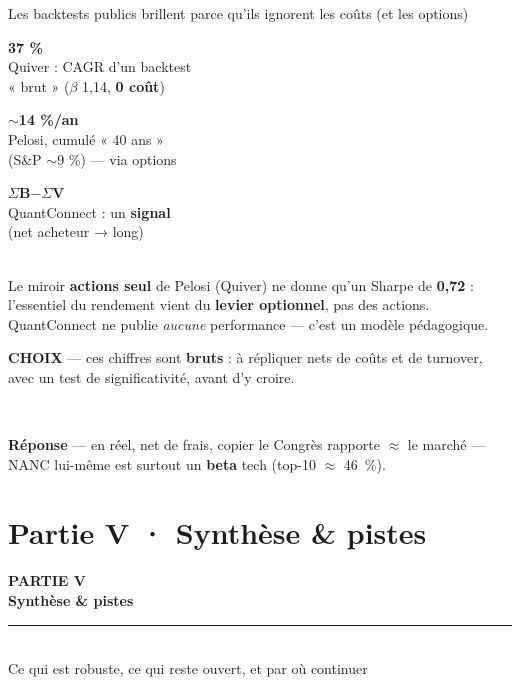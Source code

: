 \documentclass[11pt,aspectratio=169]{beamer}
\newcommand{\tuile}[3]{%
  \begin{minipage}[t]{0.23\textwidth}\centering
    \colorbox{#1}{\parbox[c][21mm][c]{\dimexpr\linewidth-8pt}{\centering
      {\color{white}\Large\textbf{#2}}\\[0.6mm]
      {\color{white}\footnotesize #3}}}
  \end{minipage}}
\newcommand{\choixbox}[1]{%
  \colorbox{alertred!8}{\parbox{\dimexpr\linewidth-8pt}{\scriptsize
    \textbf{\textcolor{alertred}{CHOIX}}\; --- #1}}}
\newcommand{\repband}[1]{%
  \colorbox{okgreen!12}{\parbox{\dimexpr\textwidth-10pt}{\scriptsize
    \textbf{\textcolor{okgreen}{Réponse}}\; --- #1}}}
\begin{document}
\begin{frame}{Les backtests publics brillent parce qu'ils ignorent les coûts (et les options)}
  \centering
  \vspace{0.5mm}
  \tuile{helec}{37 \%}{Quiver : CAGR d'un backtest\\« brut » ($\beta$ 1,14, \textbf{0 coût})}\hfill
  \tuile{warnorange}{$\sim$14 \%/an}{Pelosi, cumulé « 40 ans »\\(S\&P $\sim$9 \%) --- via options}\hfill
  \tuile{grisC}{$\Sigma$B$-\Sigma$V}{QuantConnect : un \textbf{signal}\\(net acheteur → long)}\\[3mm]
  {\footnotesize Le miroir \textbf{actions seul} de Pelosi (Quiver) ne donne qu'un Sharpe de \textbf{0,72} :
   l'essentiel du rendement vient du \textbf{levier optionnel}, pas des actions.\\
   QuantConnect ne publie \emph{aucune} performance --- c'est un modèle pédagogique.}\\[3mm]
  \choixbox{ces chiffres sont \textbf{bruts} : à répliquer nets de coûts et de turnover, avec un test
   de significativité, avant d'y croire.}\\[2mm]
  \repband{en réel, net de frais, copier le Congrès rapporte $\approx$ le marché --- NANC lui-même est
   surtout un \textbf{beta} tech (top-10 $\approx$ 46~\%).}
\end{frame}

\section{Partie V · Synthèse \& pistes}

\begin{frame}[plain]
  \centering
  \vspace{12mm}
  {\color{helec!85}\large\textbf{PARTIE V}}\\[3mm]
  {\color{black!88}\fontsize{30}{34}\selectfont\textbf{Synthèse \& pistes}}\\[3mm]
  {\color{helec!45}\rule{0.30\textwidth}{1.2pt}}\\[3mm]
  {\color{black!55}\large Ce qui est robuste, ce qui reste ouvert, et par où continuer}
\end{frame}
\end{document}
